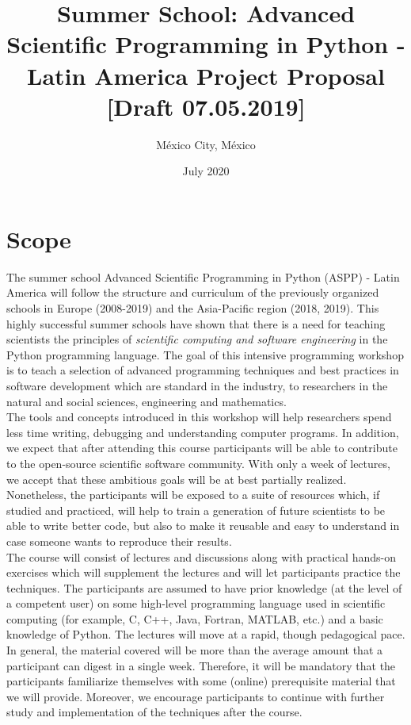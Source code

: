 \documentclass{article}[11pt]
\title{%
Summer School: Advanced Scientific Programming in Python - Latin America \linebreak
  \large Project Proposal [Draft 07.05.2019]}
\date{July 2020}
\author{M\'exico City, M\'exico}
\begin{document}
\maketitle

\begin{center}
\end{center}

\section*{Scope}
The summer school Advanced Scientific Programming in Python (ASPP) - Latin America will follow the structure and curriculum of the previously organized schools in Europe (2008-2019) and the Asia-Pacific region (2018, 2019). This highly successful summer schools have shown that there is a need for  teaching scientists the principles of \emph{scientific computing and software engineering} in the Python programming language. The goal of this intensive programming workshop is to teach a selection of advanced programming techniques and best practices in  software development which are standard in the industry, to researchers in the natural and social sciences, engineering and mathematics.\\

The tools and concepts introduced in this workshop will help researchers spend less time writing, debugging and understanding computer programs. In addition, we expect that after attending this course participants will be able to contribute to the open-source scientific software community. With only a week of lectures, we accept that these ambitious goals will be at best partially realized. Nonetheless, the participants will be exposed to a suite of resources which, if studied and practiced, will help to train a generation of future scientists to be able to write better code, but also to make it reusable and easy to understand in case someone wants to reproduce their results.\\

The course will  consist of lectures and discussions along with practical hands-on exercises which will supplement the lectures and will let participants practice the techniques. The participants are assumed to have prior knowledge (at the level of a competent user) on some high-level programming language used in scientific computing (for example, C, C++, Java, Fortran, MATLAB, etc.) and a basic knowledge of Python. The lectures will move at a rapid, though pedagogical pace. In general, the material covered will be more than the average amount that a participant can digest in a single week. Therefore, it will be mandatory that the participants familiarize themselves with some (online) prerequisite  material that we will provide. Moreover, we encourage participants to continue with further study and implementation of the techniques after the course.\\
\end{document}
